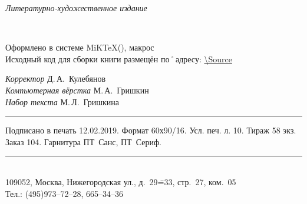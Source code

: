 ﻿\clearpage

\thispagestyle{empty}
\noindent\begin{center}
	{\itshape Литературно-художественное издание\par}
\end{center}	
\vfill\noindent
\begin{center}
	{\large{\bfseries\MakeUppercase{\AuthorFam}} \AuthorName\\[3ex]}	
	{\LARGE\Title}
\end{center}

\small 
\vfill\noindent
\begin{center}
	Оформлено в системе MiK\TeX(\LaTeXe), макрос \KOMAScript\\[1ex]
	Исходный код для сборки книги размещён по˚адресу: \footnotesize\url{\Source}
\end{center}
	
\vfill\noindent
\begin{center}
	{\itshape Корректор} Д.\,А.~Кулебянов\\[1ex]
	{\itshape Компьютерная вёрстка} М.\,А.~Гришкин\\[1ex]
	{\itshape Набор текста} М.\,Л.~Гришкина\\[1ex]
\end{center}

\vfill\noindent
\rule{\textwidth}{.5pt}
\begin{center}
	Подписано в печать  12.02.2019. Формат 60х90/16. Усл. печ. л. 10. Тираж 58 экз. Заказ 104. Гарнитура ПТ~Санс, ПТ~Сериф.		
\end{center}
\rule{\textwidth}{.5pt}

\vfil\noindent		
\begin{center}
		\Publisher\\
		109052, Москва, Нижегородская ул., д.~29\==33, стр.~27, ком.~05\\
		Тел.: (495)973–72–28, 665–34–36			

\end{center}

